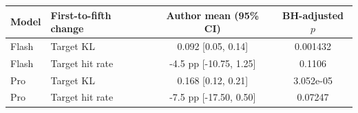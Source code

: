 \begin{tabular}{llcc}
\toprule
Model & First-to-fifth change & Author mean (95\% CI) & BH-adjusted $p$ \\
\midrule
Flash & Target KL & 0.092 [0.05, 0.14] & 0.001432 \\
Flash & Target hit rate & -4.5 pp [-10.75, 1.25] & 0.1106 \\
Pro & Target KL & 0.168 [0.12, 0.21] & 3.052e-05 \\
Pro & Target hit rate & -7.5 pp [-17.50, 0.50] & 0.07247 \\
\bottomrule
\end{tabular}
